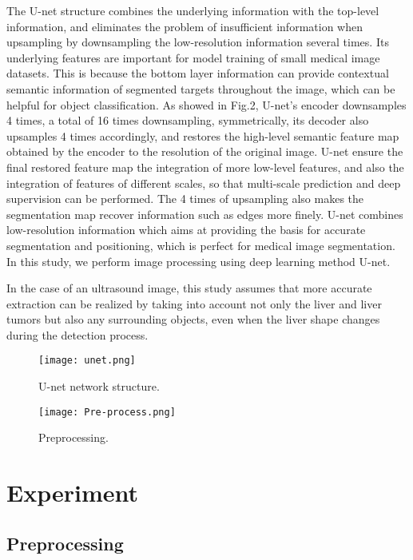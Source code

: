 \documentclass[a4paper]{article}
\begin{document}
The U-net structure combines the underlying information with the top-level information, and eliminates the problem of insufficient information when upsampling by downsampling the low-resolution information several times. Its underlying features are important for model training of small medical image datasets. This is because the bottom layer information can provide contextual semantic information of segmented targets throughout the image, which can be helpful for object classification. As showed in Fig.2, U-net's encoder downsamples 4 times, a total of 16 times downsampling, symmetrically, its decoder also upsamples 4 times accordingly, and restores the high-level semantic feature map obtained by the encoder to the resolution of the original image. U-net ensure the final restored feature map the integration of more low-level features, and also the integration of features of different scales, so that multi-scale prediction and deep supervision can be performed. The 4 times of upsampling also makes the segmentation map recover information such as edges more finely. U-net combines low-resolution information which aims at providing the basis for accurate segmentation and positioning, which is perfect for medical image segmentation. In this study, we perform image processing using deep learning method U-net.


In the case of an ultrasound image, this study assumes that more accurate extraction can be realized by taking into account not only the liver and liver tumors but also any surrounding objects, even when the liver shape changes during the detection process.

\begin{figure}
	\centering
	\texttt{[image: unet.png]}
	\vspace*{-4mm}
	\caption{U-net network structure.}
	\label{fig: fig1}
\end{figure}


\begin{figure}
	\centering
	\texttt{[image: Pre-process.png]}
	\vspace*{-4mm}
	\caption{Preprocessing.}
	\label{fig: fig1}
\end{figure}


\section{Experiment}

\subsection{Preprocessing}
\end{document}
